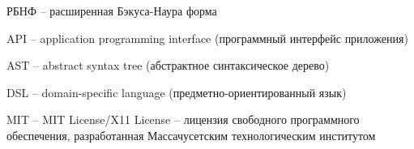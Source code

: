 
РБНФ -- расширенная Бэкуса-Наура форма

API -- application programming interface (программный интерфейс приложения) 

AST -- abstract syntax tree (абстрактное синтаксическое дерево)

DSL -- domain-specific language (предметно-ориентированный язык)

MIT -- MIT License/X11 License -- лицензия свободного программного обеспечения, разработанная Массачусетским технологическим институтом